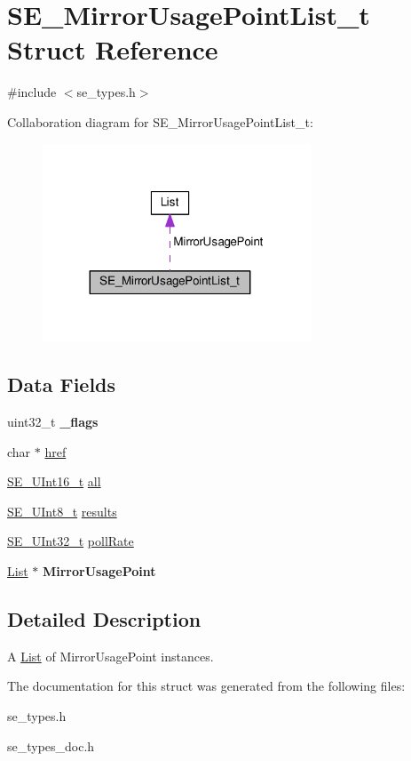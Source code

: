 \hypertarget{structSE__MirrorUsagePointList__t}{}\section{S\+E\+\_\+\+Mirror\+Usage\+Point\+List\+\_\+t Struct Reference}
\label{structSE__MirrorUsagePointList__t}


{\ttfamily \#include $<$se\+\_\+types.\+h$>$}



Collaboration diagram for S\+E\+\_\+\+Mirror\+Usage\+Point\+List\+\_\+t\+:\nopagebreak
\begin{figure}[H]
\begin{center}
\leavevmode
\includegraphics[width=227pt]{structSE__MirrorUsagePointList__t__coll__graph}
\end{center}
\end{figure}
\subsection*{Data Fields}
\begin{DoxyCompactItemize}
\item 
uint32\+\_\+t {\bfseries \+\_\+flags}
\item 
char $\ast$ \hyperlink{group__MirrorUsagePointList_ga575db02c1e3401b72229b00646a12fba}{href}
\item 
\hyperlink{group__UInt16_gac68d541f189538bfd30cfaa712d20d29}{S\+E\+\_\+\+U\+Int16\+\_\+t} \hyperlink{group__MirrorUsagePointList_gac3f1fba94c5ceb565f2ff2eedf3f425d}{all}
\item 
\hyperlink{group__UInt8_gaf7c365a1acfe204e3a67c16ed44572f5}{S\+E\+\_\+\+U\+Int8\+\_\+t} \hyperlink{group__MirrorUsagePointList_ga56c6a07daa7b9e0e2a30b9259bdc8f29}{results}
\item 
\hyperlink{group__UInt32_ga70bd4ecda3c0c85d20779d685a270cdb}{S\+E\+\_\+\+U\+Int32\+\_\+t} \hyperlink{group__MirrorUsagePointList_ga7b84695ca0e779b95c2b489d3d8257e3}{poll\+Rate}
\item 
\hyperlink{structList}{List} $\ast$ {\bfseries Mirror\+Usage\+Point}
\end{DoxyCompactItemize}


\subsection{Detailed Description}
A \hyperlink{structList}{List} of Mirror\+Usage\+Point instances. 

The documentation for this struct was generated from the following files\+:\begin{DoxyCompactItemize}
\item 
se\+\_\+types.\+h\item 
se\+\_\+types\+\_\+doc.\+h\end{DoxyCompactItemize}

